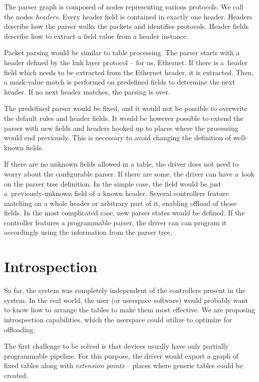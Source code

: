 The parser graph is composed of nodes representing various protocols. We
call the nodes \emph{headers}. Every header field is contained in exactly one header.
Headers describe how the parser walks the packets and identifies protocols.
Header fields describe how to extract a field value from a header instance.

Packet parsing would be similar to table processing. The parser
starts with a header defined by the link layer protocol -- for us, Ethernet. If there is
a~header field which needs to be extracted from the Ethernet header, it is
extracted. Then, a mask-value match is performed on predefined fields to
determine the next header. If no next header matches, the parsing is over.

The predefined parser would be fixed, and it would not be possible to overwrite
the default rules and header fields. It would be however possible to extend the
parser with new fields and headers hooked up to places where the processing
would end previously. This is necessary to avoid changing the definition of
well-known fields.

If there are no unknown fields allowed in a table, the driver does not need to worry
about the configurable parser. If there are some, the driver can have a~look
on the parser tree definition. In the simple case, the field would be just
a~previously-unknown field of a known header. Several controllers feature
matching on a whole header or arbitrary part of it, enabling offload of those
fields. In the most complicated case, new parser states would be defined. If
the controller features a programmable parser, the driver can can program it
accordingly using the information from the parser tree.

\section{Introspection}

So far, the system was completely independent of the controllers present in the
system. In the real world, the user (or userspace software) would probably want
to know how to arrange the tables to make them most effective. We are proposing
introspection capabilities, which the userspace could utilize to optimize for
offloading.

The first challenge to be solved is that devices usually have only
partially programmable pipeline. For this purpose, the driver would export
a graph of fixed tables along with \emph{extension points} -- places where
generic tables could be created.

